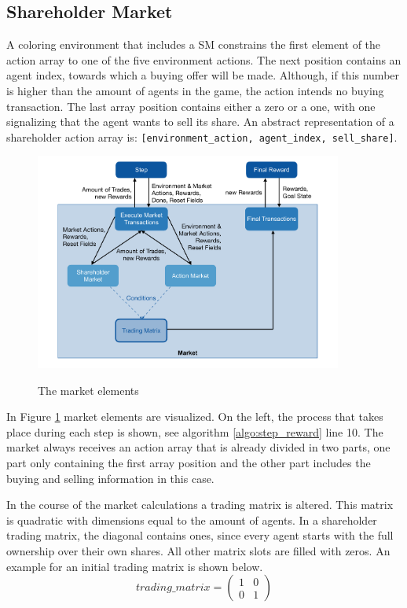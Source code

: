 \subsection{Shareholder Market}\label{shareholder_market}
A coloring environment that includes a SM constrains the first element of the action array to one of the five environment actions. The next position contains an agent index, towards which a buying offer will be made. Although, if this number is higher than the amount of agents in the game, the action intends no buying transaction. The last array position contains either a zero or a one, with one signalizing that the agent wants to sell its share. An abstract representation of a shareholder action array is: \verb|[environment_action, agent_index, sell_share]|.

\begin{figure}[hpbt]
    \centering
    \includegraphics[width=0.9\textwidth]{pictures/market}\\
    \caption[Market Elements]{The market elements}\label{fig:market}
\end{figure}

In Figure \ref{fig:market} market elements are visualized. On the left, the process that takes place during each step is shown, see algorithm \ref{algo:step_reward} line 10. The market always receives an action array that is already divided in two parts, one part only containing the first array position and the other part includes the buying and selling information in this case.

In the course of the market calculations a trading matrix is altered. This matrix is quadratic with dimensions equal to the amount of agents. In a shareholder trading matrix, the diagonal contains ones, since every agent starts with the full ownership over their own shares. All other matrix slots are filled with zeros. An example for an initial trading matrix is shown below.
\begin{equation*}
trading\_matrix = 
\begin{pmatrix}
1 & 0 \\
0 & 1
\end{pmatrix}
\end{equation*}

